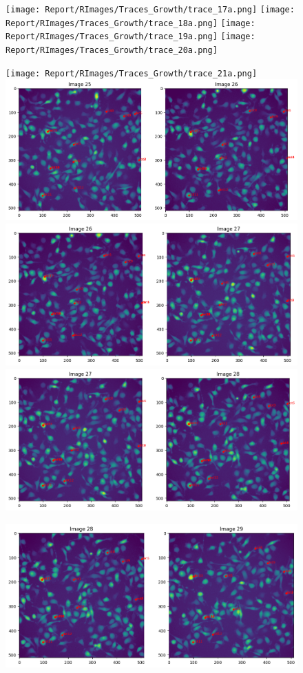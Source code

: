 \documentclass{article}
\begin{document}
\begin{figure}[h!]
\centering
\texttt{[image: Report/RImages/Traces\_Growth/trace\_17a.png]}
\texttt{[image: Report/RImages/Traces\_Growth/trace\_18a.png]}
\texttt{[image: Report/RImages/Traces\_Growth/trace\_19a.png]}
\texttt{[image: Report/RImages/Traces\_Growth/trace\_20a.png]}
\end{figure}

\clearpage


\begin{figure}[h!]
\centering
\texttt{[image: Report/RImages/Traces\_Growth/trace\_21a.png]}
\includegraphics[width=0.75\linewidth]
{Report/RImages/Traces_Growth/trace-b26.png}
\includegraphics[width=0.75\linewidth]{Report/RImages/Traces_Growth/trace-b27.png}
\includegraphics[width=0.75\linewidth]{Report/RImages/Traces_Growth/trace-b28.png}
\end{figure}


\begin{figure}[h!]
\centering
\includegraphics[width=0.75\linewidth]{Report/RImages/Traces_Growth/trace-b29.png}
\end{figure}
\end{document}
